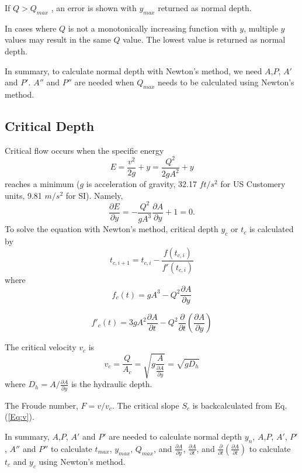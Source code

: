 \noindent If $Q > Q_{max}$ , an error is shown with $y_{max}$ returned as normal depth.  

\noindent In cases where $Q$ is not a monotonically increasing function with $y$, multiple $y$ values may result in the same $Q$ value. The lowest value is returned as normal depth. 

\noindent In summary, to calculate normal depth with Newton's method, we need $A$,$P$, $A'$ and $ P'$. $A''$ and $P''$ are needed when $Q_{max}$ needs to be calculated using Newton's method.

\subsection{Critical Depth}
Critical flow occurs when the specific energy
\begin{equation}
E = \frac{v^2}{2g} + y =\frac{Q^2}{2gA^2} + y 
\end{equation}
reaches a minimum ($g$ is acceleration of gravity, 32.17 $ft/s^2$ for US Customery units, 9.81 $m/s^2$ for SI). Namely,
\begin{equation}
\frac{\partial E}{\partial y} =  -\frac{Q^2}{gA^3}\frac{\partial A}{\partial y} + 1 = 0.
\end{equation}
To solve the equation with Newton's method, critical depth $y_c$ or $t_c$ is calculated by
\begin{equation}  
t_{c,i+1} = t_{c,i} -\frac{f(t_{c,i})}{f'(t_{c,i})}
\end{equation}
where
\begin{equation}  
f_c(t)= gA^3 - Q^2\frac{\partial A}{\partial y} 
\label{Eq:C}
\end{equation}

\begin{equation}  
f'_c(t)= 3gA^2\frac{\partial A}{\partial t} - Q^2\frac{\partial}{\partial t}\left(\frac{\partial A}{\partial y}\right) 
\end{equation}

\noindent The critical velocity $v_c$ is 
\begin{equation}
v_c = \frac{Q}{A_c} = \sqrt{g \frac{A}{\frac{\partial A}{\partial y}}} = \sqrt{gD_h}
\end{equation}
where $D_h = A/\frac{\partial A}{\partial y}$ is the hydraulic depth.

\noindent The Froude number, $F = v/v_c$. The critical slope $S_c$ is backcalculated from Eq. (\ref{Eq:v}).

\noindent In summary, $A$,$P$, $A'$ and $ P'$ are needed to calculate normal depth $y_n$, $A$,$P$, $A'$, $ P'$, $A''$ and $P''$ to calculate $t_{max}$, $y_{max}$, $Q_{max}$, and  $\frac{\partial A}{\partial y}$,  $\frac{\partial A}{\partial t}$, and $\frac{\partial}{\partial t} \left(\frac{\partial A}{\partial t}\right)$ to calculate $t_c$ and $y_c$ using Newton's method.

